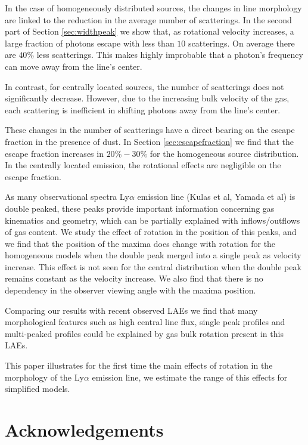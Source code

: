 \documentclass{emulateapj}
\begin{document}
In the case of homogeneously distributed sources, the changes in
line morphology are linked to the reduction in the average number of
scatterings. In the second part of Section \ref{sec:widthpeak} we show
that, as rotational velocity increases, a large fraction of photons
escape with less than $10$ scatterings. On average there are $40\%$
less scatterings. This makes highly improbable that a photon's
frequency can move away from the line's center. 

In contrast, for centrally located sources, the number of scatterings
does not significantly decrease. However, due to the increasing
bulk velocity of the gas, each scattering is inefficient in shifting
photons away from the line's center.  


These changes in the number of scatterings have a direct bearing on
the escape fraction in the presence of dust.  In Section
\ref{sec:escapefraction} we find that the escape fraction increases in
$20\%-30\%$ for the homogeneous source distribution. In the centrally
located emission, the rotational effects are negligible on the escape
fraction. 



As many observational spectra Ly$\alpha$ emission line (Kulas et al,
Yamada et al) is double  peaked, these peaks provide important information
concerning gas kinematics and geometry,  which can be partially
explained with inflows/outflows of gas content.  We study the effect
of rotation in the position of this peaks, and we find  that the
position of the maxima does change with rotation for the homogeneous
models when the double peak merged into a single peak as velocity
increase. This effect is not seen for the central distribution when
the double peak  remains constant as the velocity increase. We also
find that there is no dependency in the observer viewing angle with
the maxima position. 


Comparing our results with recent observed LAEs we find that many 
morphological features such as high central line flux, single peak
profiles and multi-peaked profiles could be explained by gas bulk 
rotation present in this LAEs.

This paper illustrates for the first time the main effects of rotation
in the morphology of the Ly$\alpha$ emission line, we estimate the
range of this effects for simplified models.


\section*{Acknowledgements}


 
\end{document}
